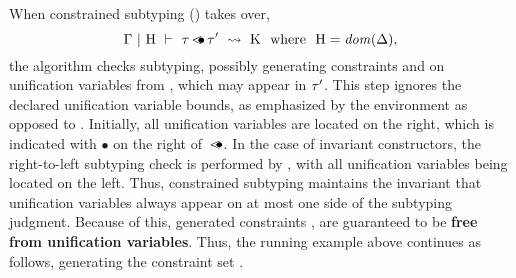 When constrained subtyping () takes over,
\[ \Gamma~\vert~\mathrm{H}\ \vdash\ \tau \operatorname{\lessdot\!\!\bullet} \tau'\ \rightsquigarrow\ \mathrm{K}\ \text{ where }\ \mathrm{H} = \operatorname{\mathit{dom}}(\Delta), \]
the algorithm checks subtyping, possibly generating constraints 
\ctrsub{\tylb}{\va} and \ctrsub{\va}{\tyub} on
unification variables \va from \UEnvD, which may appear in $\tau'$.
This step ignores the declared unification variable bounds,
as emphasized by the environment \UEnvD as opposed to \UEnv.
Initially, all unification variables are located on the right,
which is indicated with $\bullet$ on the right of~$\operatorname{\lessdot\!\!\bullet}$.
In the case of invariant constructors, the right-to-left subtyping check
is performed by , with all unification variables
being located on the left.
Thus, constrained subtyping maintains the invariant that unification
variables always appear on at most one side of the subtyping judgment.
Because of this, generated constraints \tylb, \tyub are guaranteed to be 
\textbf{free from unification variables}.
Thus, the running example above continues as follows,
generating the constraint set {\ctrset{\ctrsub{\vx}{\va}, \ctrsub{\va}{\vx}}}.

